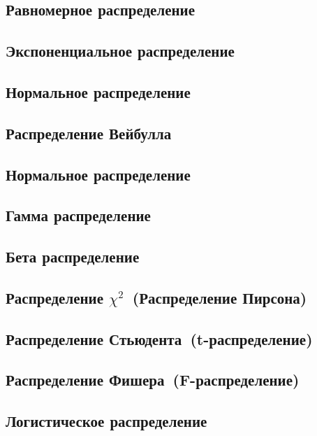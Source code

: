 \documentclass[]{scrartcl}
\begin{document}
\subsection{Равномерное распределение}

\subsection{Экспоненциальное распределение}

\subsection{Нормальное распределение}

\subsection{Распределение Вейбулла}

\subsection{Нормальное распределение}

\subsection{Гамма распределение}

\subsection{Бета распределение}

\subsection{Распределение $\chi^{2}$~(Распределение Пирсона)}

\subsection{Распределение Стьюдента~(t-распределение)}

\subsection{Распределение Фишера~(F-распределение)}

\subsection{Логистическое распределение}
\end{document}
